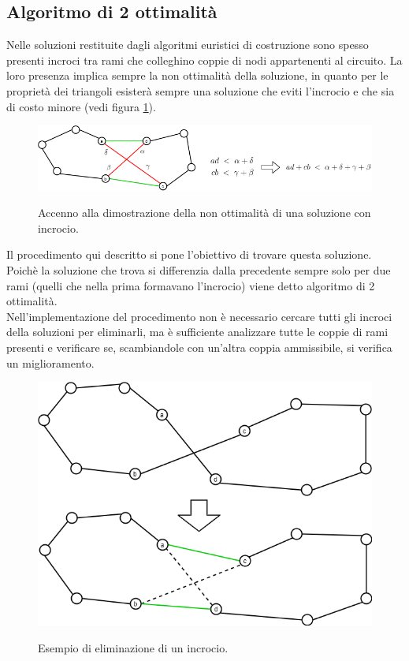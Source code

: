 \subsection{Algoritmo di 2 ottimalità}
Nelle soluzioni restituite dagli algoritmi euristici di costruzione sono spesso presenti incroci tra rami che colleghino coppie di nodi appartenenti al circuito. La loro presenza implica sempre la non ottimalità della soluzione, in quanto per le proprietà dei triangoli esisterà sempre una soluzione che eviti l'incrocio e che sia di costo minore (vedi figura \ref{cross}). 
\begin{figure}[h] 
\begin{center} 
  \includegraphics[scale=0.4]{Images/triangle_property}\\ 
  \caption{\footnotesize{Accenno alla dimostrazione della non ottimalità di una soluzione con incrocio.}}
  \label{cross}
\end{center}
\end{figure}
Il procedimento qui descritto si pone l'obiettivo di trovare questa soluzione. Poichè la soluzione che trova si differenzia dalla precedente sempre solo per due rami (quelli che nella prima formavano l'incrocio) viene detto algoritmo di 2 ottimalità.\\
Nell'implementazione del procedimento non è necessario cercare tutti gli incroci della soluzioni per eliminarli, ma è sufficiente analizzare tutte le coppie di rami presenti e verificare se, scambiandole con un'altra coppia ammissibile, si verifica un miglioramento.
\begin{figure}[h] 
\begin{center} 
  \includegraphics[scale=0.3]{Images/switch}\\ 
  \caption{\footnotesize{Esempio di eliminazione di un incrocio.}}
  \label{switch}
\end{center}
\end{figure}
